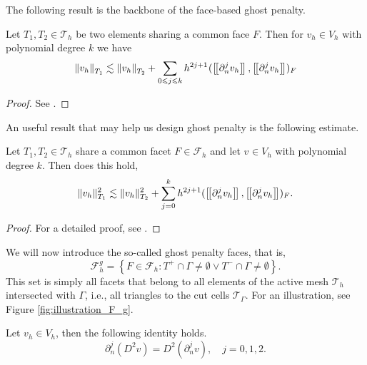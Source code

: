 The following result is the backbone of the face-based ghost penalty.
\begin{lemma}
    Let $T_{1},T_{2 } \in  \mathcal{T} _{h}$ be two elements sharing a common face $F$. Then for $v_{h} \in V_{h}$ with polynomial degree $k$  we have
    \begin{equation}
    \| v_{h} \|_{ T_{1} }^{  }  \lesssim \| v_{h} \|_{ T_{2} }^{  } + \sum_{0\leqslant j\leqslant k}  {h^{2j +1}}^{} ( \left[\!\left[  \partial _{n}^{j} v_{h}  \right]\!\right], \left[\!\left[  \partial ^{j}_{n} v_{h}  \right]\!\right]    )_{F}
    \end{equation}

\end{lemma}
\begin{proof}
    See \cite[Lemma 2.19]{gurkan2019stabilized}.
\end{proof}

An useful result that may help us design ghost penalty is the following estimate.

\begin{lemma}
    \label{lemma:bi_local_facet_estimate}
    Let $T_{1}, T_{2} \in  \mathcal{T} _{h} $ share a common facet $F \in \mathcal{F}_{h} $ and let $v_{} \in  V_{h}$ with polynomial degree $k$. Then does this hold,
    \begin{equation}
    \| v_{h} \|_{ T_{1} }^{  2}  \lesssim  \| v_{h} \|_{ T_{2} }^{2  }  + \sum_{j=0}^{k}  h^{2j +1} ( \left[\!\left[  \partial _{n}^{j} v_{h} \right]\!\right], \left[\!\left[  \partial _{n}^{j} v_{h} \right]\!\right]    )_{F}.
    \end{equation}

\end{lemma}

\begin{proof}
    For a detailed proof, see \cite{gurkan2019stabilized}.
\end{proof}

We will now introduce the so-called ghost penalty faces, that is, \[
\mathcal{F} ^{g}_{h} = \left\{ F\in \mathcal{F} _{h} : T^{+}\cap \Gamma \neq \emptyset  \vee T^{-}\cap \Gamma \neq \emptyset  \right\}.
\]
This set is simply all facets that belong to all elements of the active mesh $\mathcal{T} _{h}$  intersected with $\Gamma $, i.e., all triangles to the cut cells $\mathcal{T} _{\Gamma }$. For an illustration, see Figure \ref{fig:illustration_F_g}.

\begin{proposition}
    \label{prop:hessian_change}
    Let $v_{h} \in V_{h} $, then the following identity holds.
    \begin{equation}
    \partial ^{j}_{n} (D^2v) = D^2 ( \partial ^{j}_{n} v), \quad  j=0,1,2.
    \end{equation}
\end{proposition}

